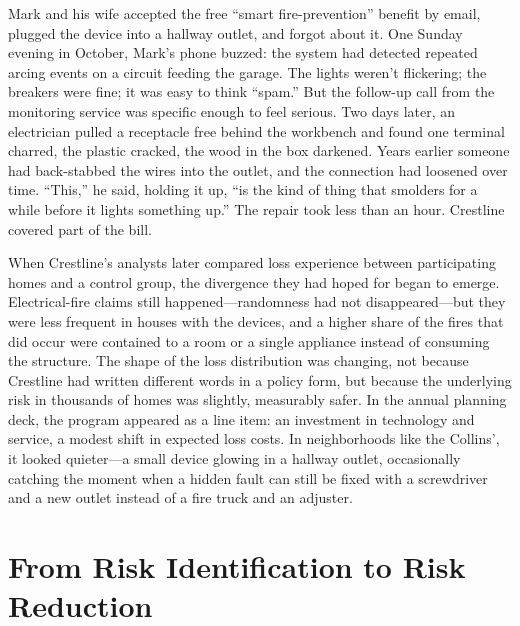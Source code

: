 \documentclass[11pt,openany]{book}
\begin{document}
\begin{corporateexample}
Mark and his wife accepted the free ``smart fire-prevention'' benefit by
email, plugged the device into a hallway outlet, and forgot about it. One
Sunday evening in October, Mark's phone buzzed: the system had detected
repeated arcing events on a circuit feeding the garage. The lights weren't
flickering; the breakers were fine; it was easy to think ``spam.'' But the
follow-up call from the monitoring service was specific enough to feel
serious. Two days later, an electrician pulled a receptacle free behind the
workbench and found one terminal charred, the plastic cracked, the wood in the
box darkened. Years earlier someone had back-stabbed the wires into the
outlet, and the connection had loosened over time. ``This,'' he said, holding
it up, ``is the kind of thing that smolders for a while before it lights
something up.'' The repair took less than an hour. Crestline covered part of
the bill.

When Crestline's analysts later compared loss experience between participating
homes and a control group, the divergence they had hoped for began to emerge.
Electrical-fire claims still happened---randomness had not disappeared---but
they were less frequent in houses with the devices, and a higher share of the
fires that did occur were contained to a room or a single appliance instead of
consuming the structure. The shape of the loss distribution was changing, not
because Crestline had written different words in a policy form, but because
the underlying risk in thousands of homes was slightly, measurably safer. In
the annual planning deck, the program appeared as a line item: an investment
in technology and service, a modest shift in expected loss costs. In
neighborhoods like the Collins', it looked quieter---a small device glowing in
a hallway outlet, occasionally catching the moment when a hidden fault can
still be fixed with a screwdriver and a new outlet instead of a fire truck and
an adjuster.

\end{corporateexample}

\section{From Risk Identification to Risk Reduction}
\label{sec:loss-control-imperative}
\end{document}
